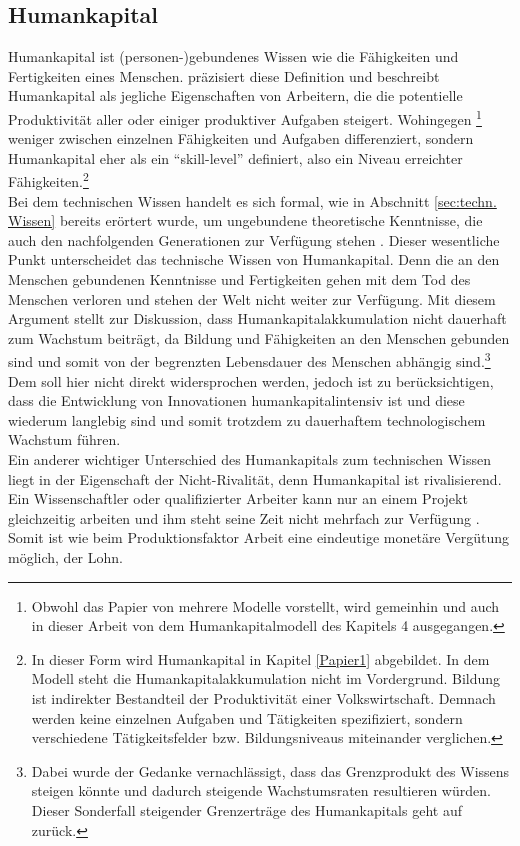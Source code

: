 \subsection{Humankapital}
%
Humankapital ist (personen-)gebundenes Wissen wie die Fähigkeiten und Fertigkeiten eines Menschen. \cite[Kapitel 7,S.259]{Acemoglu.2009} präzisiert diese Definition und beschreibt Humankapital als jegliche Eigenschaften von Arbeitern, die die potentielle Produktivität aller oder einiger produktiver Aufgaben steigert. Wohingegen \cite{Lucas.1988}\footnote{Obwohl das Papier von \cite{Lucas.1988} mehrere Modelle vorstellt, wird gemeinhin und auch in dieser Arbeit von dem Humankapitalmodell des Kapitels 4 ausgegangen.} weniger zwischen einzelnen Fähigkeiten und Aufgaben differenziert, sondern Humankapital eher als ein "`skill-level"' definiert, also ein Niveau erreichter Fähigkeiten.\footnote{In dieser Form wird Humankapital in Kapitel \ref{Papier1} abgebildet. In dem Modell steht die Humankapitalakkumulation nicht im Vordergrund. Bildung ist indirekter Bestandteil der Produktivität einer Volkswirtschaft. Demnach werden keine einzelnen Aufgaben und Tätigkeiten spezifiziert, sondern verschiedene Tätigkeitsfelder bzw. Bildungsniveaus miteinander verglichen.} \\
%
Bei dem technischen Wissen handelt es sich formal, wie in Abschnitt \ref{sec:techn. Wissen} bereits erörtert wurde, um ungebundene theoretische Kenntnisse, die auch den nachfolgenden Generationen zur Verfügung stehen \cite[Kapitel 10]{Frenkel.1999}. Dieser wesentliche Punkt unterscheidet das technische Wissen von Humankapital. Denn die an den Menschen gebundenen Kenntnisse und Fertigkeiten gehen mit dem Tod des Menschen verloren und stehen der Welt nicht weiter zur Verfügung. Mit diesem Argument stellt \cite{Ha.2002} zur Diskussion, dass Humankapitalakkumulation nicht dauerhaft zum Wachstum beiträgt, da Bildung und Fähigkeiten an den Menschen gebunden sind und somit von der begrenzten Lebensdauer des Menschen abhängig sind.\footnote{Dabei wurde der Gedanke vernachlässigt, dass das Grenzprodukt des Wissens steigen könnte und dadurch steigende Wachstumsraten resultieren würden. Dieser Sonderfall steigender Grenzerträge des Humankapitals geht auf \cite{Romer.1986} zurück.}  Dem soll hier nicht direkt widersprochen werden, jedoch ist zu berücksichtigen, dass die Entwicklung von Innovationen humankapitalintensiv ist und diese wiederum langlebig sind und somit trotzdem zu dauerhaftem technologischem Wachstum führen. \\
%
Ein anderer wichtiger Unterschied des Humankapitals zum technischen Wissen liegt in der Eigenschaft der Nicht-Rivalität, denn Humankapital ist rivalisierend. Ein Wissenschaftler oder qualifizierter Arbeiter kann nur an einem Projekt gleichzeitig arbeiten und ihm steht seine Zeit nicht mehrfach zur Verfügung \cite{Romer.1993}. Somit ist wie beim Produktionsfaktor Arbeit eine eindeutige monetäre Vergütung möglich, der Lohn.\\
